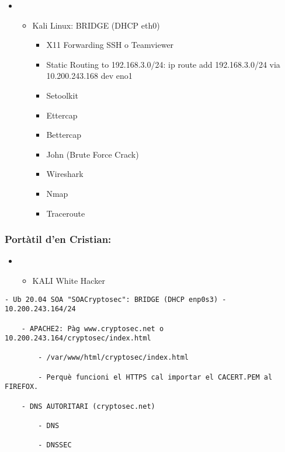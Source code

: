 \documentclass[]{article}
\providecommand{\tightlist}{%
  \setlength{\itemsep}{0pt}\setlength{\parskip}{0pt}}
\begin{document}
\begin{itemize}
\item
  \begin{itemize}
  \item
    Kali Linux: BRIDGE (DHCP eth0)

    \begin{itemize}
    \item
      X11 Forwarding SSH o Teamviewer
    \item
      Static Routing to 192.168.3.0/24: ip route add 192.168.3.0/24 via
      10.200.243.168 dev eno1
    \item
      Setoolkit
    \item
      Ettercap
    \item
      Bettercap
    \item
      John (Brute Force Crack)
    \item
      Wireshark
    \item
      Nmap
    \item
      Traceroute
    \end{itemize}
  \end{itemize}
\end{itemize}

\hypertarget{portuxe0til-den-cristian}{%
\subsubsection{\texorpdfstring{\textbf{Portàtil d'en
Cristian}:}{Portàtil d'en Cristian:}}\label{portuxe0til-den-cristian}}

\begin{itemize}
\item
  \begin{itemize}
  \tightlist
  \item
    KALI White Hacker
  \end{itemize}
\end{itemize}

\begin{verbatim}
- Ub 20.04 SOA "SOACryptosec": BRIDGE (DHCP enp0s3) - 10.200.243.164/24

    - APACHE2: Pàg www.cryptosec.net o 10.200.243.164/cryptosec/index.html

        - /var/www/html/cryptosec/index.html

        - Perquè funcioni el HTTPS cal importar el CACERT.PEM al FIREFOX.

    - DNS AUTORITARI (cryptosec.net)

        - DNS

        - DNSSEC
\end{verbatim}
\end{document}
